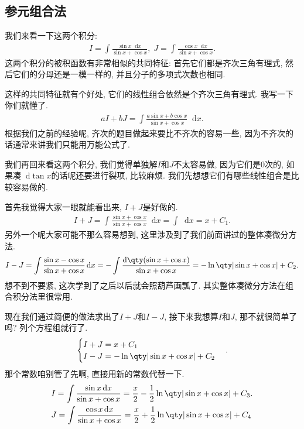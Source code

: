 \documentclass{ctexbook}
\newcommand*{\dif}{\mathop{}\!\mathrm{d}}
\begin{document}
{\subsection{参元组合法}
我们来看一下这两个积分: 
\begin{align*}
I=\int\frac{\sin{x}\dif{x}}{\sin{x}+\cos{x}},\;J=\int\frac{\cos{x}\dif{x}}{\sin{x}+\cos{x}}
.\end{align*}
这两个积分的被积函数有非常相似的共同特征: 首先它们都是齐次三角有理式, 然后它们的分母还是一模一样的, 并且分子的多项式次数也相同. \par
这样的共同特征就有个好处, 它们的线性组合依然是个齐次三角有理式. 我写一下你们就懂了. 
\begin{align*}
aI+bJ=\int\frac{a\sin{x}+b\cos{x}}{\sin{x}+\cos{x}}\dif{x}
.\end{align*}
根据我们之前的经验呢, 齐次的题目做起来要比不齐次的容易一些, 因为不齐次的话通常来讲我们只能用万能公式了. \par
我们再回来看这两个积分, 我们觉得单独解$I$和$J$不太容易做, 因为它们是$0$次的, 如果凑$\dif{\tan{x}}$的话呢还要进行裂项, 比较麻烦. 我们先想想它们有哪些线性组合是比较容易做的. \par
首先我觉得大家一眼就能看出来, $I+J$是好做的. 
\begin{align*}
I+J=\int\frac{\sin{x}+\cos{x}}{\sin{x}+\cos{x}}\dif{x}=\int\dif{x}=x+C_{1}
.\end{align*}
另外一个呢大家可能不那么容易想到, 这里涉及到了我们前面讲过的整体凑微分方法. 
\begin{align*}
I-J=\int\frac{\sin{x}-\cos{x}}{\sin{x}+\cos{x}}\dif{x}=-\int\frac{\dif{\qty(\sin{x}+\cos{x})}}{\sin{x}+\cos{x}}=-\ln\qty|\sin{x}+\cos{x}|+C_{2}
.\end{align*}
想不到不要紧, 这次学到了之后以后就会照葫芦画瓢了. 其实整体凑微分方法在组合积分法里很常用. \par
现在我们通过简便的做法求出了$I+J$和$I-J$, 接下来我想算$I$和$J$, 那不就很简单了吗? 列个方程组就行了. 
\begin{align*}
\begin{cases}
I+J=x+C_{1}\\
I-J=-\ln\qty|\sin{x}+\cos{x}|+C_{2}
\end{cases}
.\end{align*}
那个常数咱别管了先啊, 直接用新的常数代替一下. 
\begin{align*}
{}&I=\int\frac{\sin{x}\dif{x}}{\sin{x}+\cos{x}}=\frac{x}{2}-\frac{1}{2}\ln\qty|\sin{x}+\cos{x}|+C_{3}.\\
{}&J=\int\frac{\cos{x}\dif{x}}{\sin{x}+\cos{x}}=\frac{x}{2}+\frac{1}{2}\ln\qty|\sin{x}+\cos{x}|+C_{4}

\end{align*}}
\end{document}
